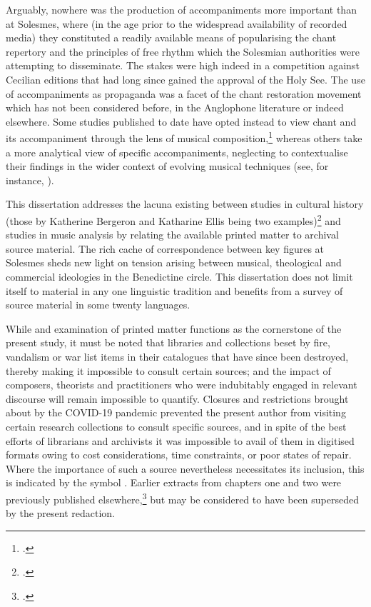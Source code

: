 Arguably, nowhere was the production of accompaniments more important than at Solesmes, where (in the age prior to the widespread availability of recorded media) they constituted a readily available means of popularising the chant repertory and the principles of free rhythm which the Solesmian authorities were attempting to disseminate.
The stakes were high indeed in a competition against Cecilian editions that had long since gained the approval of the Holy See.
The use of accompaniments as propaganda was a facet of the chant restoration movement which has not been considered before, in the Anglophone literature or indeed elsewhere.
Some studies published to date have opted instead to view chant and its accompaniment through the lens of musical composition,\footcite{LessmannRezeptiongregorianischenChorals2016} whereas others take a more analytical view of specific accompaniments, neglecting to contextualise their findings in the wider context of evolving musical techniques (see, for instance, ).
\nowidow[2]

This dissertation addresses the lacuna existing between studies in cultural history (those by Katherine Bergeron and Katharine Ellis being two examples)\footcites{EllisPoliticsPlainchantfindesiecle2013}{BergeronDecadentEnchantmentsRevival1998} and studies in music analysis by relating the available printed matter to archival source material.
The rich cache of correspondence between key figures at Solesmes sheds new light on tension arising between musical, theological and commercial ideologies in the Benedictine circle.
This dissertation does not limit itself to material in any one linguistic tradition and benefits from a survey of source material in some twenty languages.

While and examination of printed matter functions as the cornerstone of the present study, it must be noted that libraries and collections beset by fire, vandalism or war list items in their catalogues that have since been destroyed, thereby making it impossible to consult certain sources; and the impact of composers, theorists and practitioners who were indubitably engaged in relevant discourse will remain impossible to quantify.
Closures and restrictions brought about by the COVID-19 pandemic prevented the present author from visiting certain research collections to consult specific sources, and in spite of the best efforts of librarians and archivists it was impossible to avail of them in digitised formats owing to cost considerations, time constraints, or poor states of repair.
%
Where the importance of such a source nevertheless necessitates its inclusion, this is indicated by the symbol \covid{}.
%
Earlier extracts from chapters one and two were previously published elsewhere,\footcite{LongTheoryPracticePlainchant2020} but may be considered to have been superseded by the present redaction.
